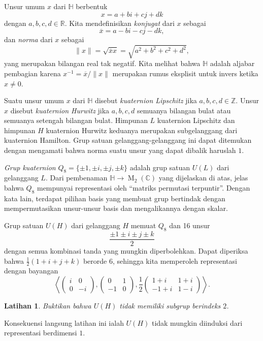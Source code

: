 \documentclass[12pt]{article}
\theoremstyle{plain}
\newtheorem{exercise}[theorem]{Latihan}
\theoremstyle{definition}
\theoremstyle{remark}
\numberwithin{equation}{section}
\begin{document}
Unsur umum $x$ dari $\mathbb{H}$ berbentuk
\[
x = a + bi + cj + dk
\]
dengan $a,b,c,d \in \mathbb{R}$.
Kita mendefinisikan \emph{konjugat} dari $x$ sebagai
\[
\overline{x} = a -bi-cj-dk,
\]
dan \emph{norma} dari $x$ sebagai
\[
\|x\| = \sqrt{\overline{x} x} = \sqrt{a^2+b^2+c^2+d^2},
\]
yang merupakan bilangan real tak negatif.
Kita melihat bahwa $\mathbb{H}$ adalah aljabar pembagian
karena $x^{-1} = \overline{x}/\|x\|$ merupakan rumus eksplisit untuk
invers ketika $x \ne 0$.

Suatu unsur umum $x$ dari $\mathbb{H}$
disebut \emph{kuaternion Lipschitz} jika
$a,b,c,d \in \mathbb{Z}$.
Unsur $x$ disebut \emph{kuaternion Hurwitz}
jika $a,b,c,d$ semuanya bilangan bulat atau semuanya setengah bilangan bulat.
Himpunan $L$ kuaternion Lipschitz dan himpunan $H$ kuaternion Hurwitz
keduanya merupakan subgelanggang dari kuaternion Hamilton.
Grup satuan gelanggang-gelanggang ini dapat ditemukan dengan mengamati bahwa norma
suatu unsur yang dapat dibalik haruslah $1$.

\emph{Grup kuaternion} $Q_8 = \{\pm 1, \pm i, \pm j, \pm k\}$ adalah
grup satuan $U(L)$ dari gelanggang $L$.
Dari pembenaman
$\mathbb{H} \to \operatorname{M}_2(\mathbb{C})$ yang dijelaskan di atas, jelas bahwa
$Q_8$ mempunyai representasi oleh ``matriks permutasi
terpuntir''.
Dengan kata lain, terdapat pilihan basis yang membuat grup bertindak dengan mempermutasikan
unsur-unsur basis dan mengalikannya dengan skalar.

Grup satuan $U(H)$ dari gelanggang $H$ memuat $Q_8$ dan 16 unsur
\[
\frac{ \pm 1 \pm i \pm j \pm k }{2}
\]
dengan semua kombinasi tanda yang mungkin diperbolehkan.
Dapat diperiksa bahwa $\frac{1}{2}(1+i+j+k)$ berorde $6$, sehingga kita memperoleh
representasi dengan bayangan
\[
\left\langle \begin{pmatrix} i&0\\0&-i \end{pmatrix},
\begin{pmatrix} 0&1\\-1&0 \end{pmatrix},
\frac{1}{2} \begin{pmatrix} 1+i&1+i\\-1+i&1-i \end{pmatrix}\right\rangle
.
\]

\begin{exercise}
Buktikan bahwa $U(H)$ tidak memiliki subgrup berindeks $2$.
\end{exercise}

Konsekuensi langsung latihan ini ialah $U(H)$ tidak mungkin
diinduksi dari representasi berdimensi $1$.
\end{document}

